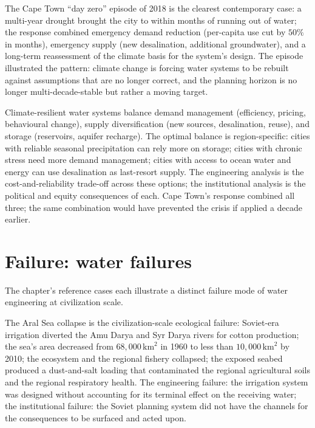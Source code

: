 The Cape Town ``day zero'' episode of 2018 \cite{acc:csir-capetown-2018} is the clearest contemporary case: a multi-year drought brought the city to within months of running out of water; the response combined emergency demand reduction (per-capita use cut by $50\%$ in months), emergency supply (new desalination, additional groundwater), and a long-term reassessment of the climate basis for the system's design. The episode illustrated the pattern: climate change is forcing water systems to be rebuilt against assumptions that are no longer correct, and the planning horizon is no longer multi-decade-stable but rather a moving target.

\begin{archetype}
Climate-resilient water systems balance demand management (efficiency, pricing, behavioural change), supply diversification (new sources, desalination, reuse), and storage (reservoirs, aquifer recharge). The optimal balance is region-specific: cities with reliable seasonal precipitation can rely more on storage; cities with chronic stress need more demand management; cities with access to ocean water and energy can use desalination as last-resort supply. The engineering analysis is the cost-and-reliability trade-off across these options; the institutional analysis is the political and equity consequences of each. Cape Town's response combined all three; the same combination would have prevented the crisis if applied a decade earlier.
\end{archetype}

\section{Failure: water failures}

The chapter's reference cases each illustrate a distinct failure mode of water engineering at civilization scale.

The Aral Sea collapse \cite{paper:micklin-aral-2007} is the civilization-scale ecological failure: Soviet-era irrigation diverted the Amu Darya and Syr Darya rivers for cotton production; the sea's area decreased from $68{,}000\,\text{km}^2$ in 1960 to less than $10{,}000\,\text{km}^2$ by 2010; the ecosystem and the regional fishery collapsed; the exposed seabed produced a dust-and-salt loading that contaminated the regional agricultural soils and the regional respiratory health. The engineering failure: the irrigation system was designed without accounting for its terminal effect on the receiving water; the institutional failure: the Soviet planning system did not have the channels for the consequences to be surfaced and acted upon.

